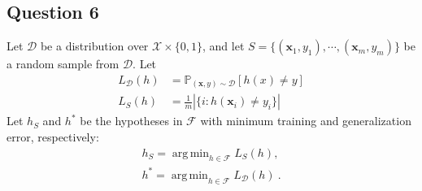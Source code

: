 \documentclass{article}
\newcommand{\field}[1]{\mathbb{#1}}
\newcommand{\set}[1]{\mathcal{#1}}
\newcommand{\fX}{\set{X}}
\newcommand{\fF}{\set{F}}
\newcommand{\fD}{\set{D}}
\renewcommand{\Pr}{\field{P}}
\DeclareMathOperator*{\argmin}{arg\,min}
\newcommand{\RiskD}{L_{\fD}}
\newcommand{\RiskS}{L_{S}}
\newcommand{\bx}{\boldsymbol{x}}
\begin{document}
\subsection{Question 6}
Let $\fD$ be a distribution over $\fX \times \{0, 1\}$, and let $S = \{(\bx_1, y_1), \cdots ,(\bx_m, y_m)\}$ be a random sample from $\fD$. Let
\begin{align*}
\RiskD(h) &= \Pr_{(\bx,y)\sim \fD} [h(x) \neq y] \\
\RiskS(h) &= \frac{1}{m} |\{i: h(\bx_i)\neq y_i\}|
\end{align*}
Let $h_S$ and $h^*$ be the hypotheses in $\fF$ with minimum training and generalization error, respectively:
\begin{align*}
h_S = \argmin_{h \in \fF} \RiskS(h),\\
h^* = \argmin_{h \in \fF} \RiskD(h)~.
\end{align*}
\end{document}
